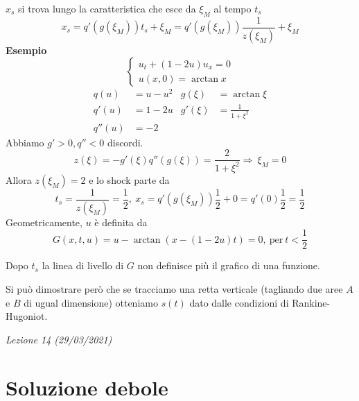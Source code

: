 \documentclass[10pt,a4paper,twoside,openright]{book}
\begin{document}
$\displaystyle x_{s}$ si trova lungo la caratteristica che esce da $\displaystyle \xi _{M}$ al tempo $\displaystyle t_{s}$
\begin{equation*}
	x_{s} =q'( g( \xi _{M})) t_{s} +\xi _{M} =q'( g( \xi _{M}))\frac{1}{z( \xi _{M})} +\xi _{M}
\end{equation*}
\textbf{Esempio}
\begin{equation*}
	\begin{cases}
		u_{t} +( 1-2u) u_{x} =0 \\
		u( x,0) =\arctan x      
	\end{cases}
\end{equation*}
\begin{align*}
	q( u)   & =u-u^{2} & g( \xi )  & =\arctan \xi          \\
	q'( u)  & =1-2u    & g'( \xi ) & =\frac{1}{1+\xi ^{2}} \\
	q''( u) & =-2      &           &                       
\end{align*}
Abbiamo $\displaystyle g' >0,q''< 0$ discordi. 
\begin{equation*}
	z( \xi ) =-g'( \xi ) q''( g( \xi )) =\frac{2}{1+\xi ^{2}} \Rightarrow \ \xi _{M} =0
\end{equation*}
Allora $\displaystyle z( \xi _{M}) =2$ e lo shock parte da
\begin{equation*}
	t_{s} =\frac{1}{z( \xi _{M})} =\frac{1}{2} ,\ x_{s} =q'( g( \xi _{M}))\frac{1}{2} +0=q'( 0)\frac{1}{2} =\frac{1}{2}
\end{equation*}
Geometricamente, $\displaystyle u$ è definita da 
\begin{equation*}
	G( x,t,u) =u-\arctan( x-( 1-2u) t) =0,\ \text{per} \ t< \frac{1}{2}
\end{equation*}


Dopo $\displaystyle t_{s}$ la linea di livello di $\displaystyle G$ non definisce più il grafico di una funzione.

Si può dimostrare però che se tracciamo una retta verticale (tagliando due aree $\displaystyle A$ e $\displaystyle B$ di ugual dimensione) otteniamo $\displaystyle s( t)$ dato dalle condizioni di Rankine-Hugoniot.


\textit{Lezione 14 (29/03/2021)}
\section{Soluzione debole}
\end{document}
